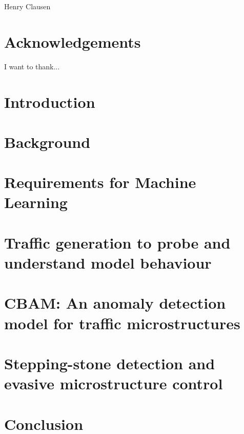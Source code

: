 \documentclass[a4paper,12pt,twoside]{report}
\begin{document}
\hspace*{0pt}\hfill Henry Clausen

\chapter*{Acknowledgements}
I want to thank...

\tableofcontents

\chapter{Introduction}


\chapter{Background}


%


%
%

\chapter{Requirements for Machine Learning}\label{Chap:Req}


\chapter{Traffic generation to probe and understand model behaviour}\label{Chap:Prob}


\chapter{CBAM: An anomaly detection model for traffic microstructures}\label{Chap:CBAM}


\chapter{Stepping-stone detection and evasive microstructure control}\label{Chap:NSS}


\chapter{Conclusion}





\end{document}

